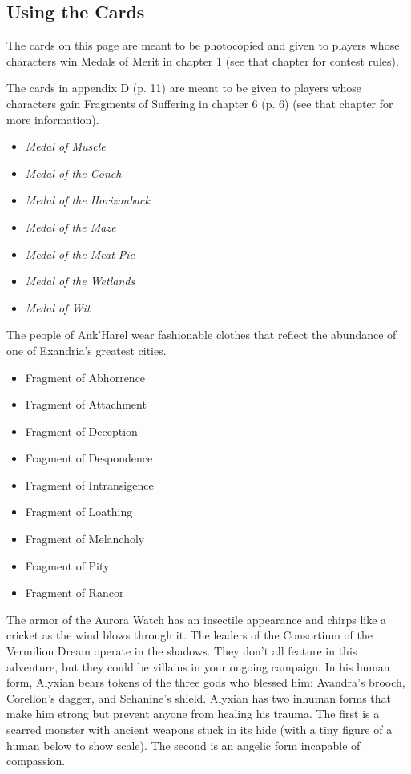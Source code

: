 \documentclass[a4paper, 11pt, bg=full, twocolumn, nooutline]{dndbook}
\begin{document}
\subsection{Using the Cards}

The cards on this page are meant to be photocopied and given to players whose characters win Medals of Merit in chapter 1 (see that chapter for contest rules).

The cards in appendix D (p. 11) are meant to be given to players whose characters gain Fragments of Suffering in chapter 6 (p. 6) (see that chapter for more information).

\begin{itemize}
\item \textit{Medal of Muscle}
\item \textit{Medal of the Conch}
\item \textit{Medal of the Horizonback}
\item \textit{Medal of the Maze}
\item \textit{Medal of the Meat Pie}
\item \textit{Medal of the Wetlands}
\item \textit{Medal of Wit}
\end{itemize}
The people of Ank'Harel wear fashionable clothes that reflect the abundance of one of Exandria's greatest cities.
\begin{itemize}
\item Fragment of Abhorrence
\item Fragment of Attachment
\item Fragment of Deception
\item Fragment of Despondence
\item Fragment of Intransigence
\item Fragment of Loathing
\item Fragment of Melancholy
\item Fragment of Pity
\item Fragment of Rancor
\end{itemize}
The armor of the Aurora Watch has an insectile appearance and chirps like a cricket as the wind blows through it.
The leaders of the Consortium of the Vermilion Dream operate in the shadows. They don't all feature in this adventure, but they could be villains in your ongoing campaign.
In his human form, Alyxian bears tokens of the three gods who blessed him: Avandra's brooch, Corellon's dagger, and Sehanine's shield.
Alyxian has two inhuman forms that make him strong but prevent anyone from healing his trauma. The first is a scarred monster with ancient weapons stuck in its hide (with a tiny figure of a human below to show scale).
The second is an angelic form incapable of compassion.
\end{document}
